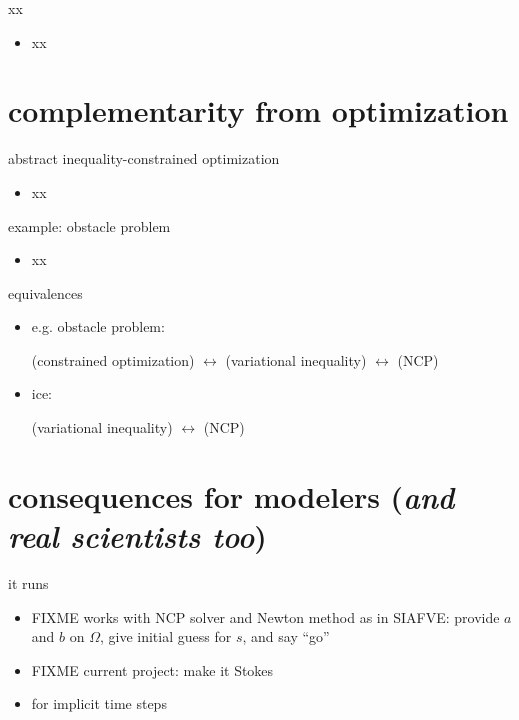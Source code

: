 \documentclass[10pt,hyperref,dvipsnames]{beamer}
\begin{document}
\begin{frame}{xx}
\begin{itemize}
\item xx
\end{itemize}
\end{frame}


\section{complementarity from optimization}

\begin{frame}{abstract inequality-constrained optimization}
\begin{itemize}
\item xx
\end{itemize}
\end{frame}

\begin{frame}{example: obstacle problem}
\begin{itemize}
\item xx
\end{itemize}
\end{frame}

\begin{frame}{equivalences}
\begin{itemize}
\item e.g. obstacle problem:

(constrained optimization) $\leftrightarrow$ (variational inequality) $\leftrightarrow$ (NCP)
\item ice:

\phantom{(constrained optimization) $\leftrightarrow$} (variational inequality) $\leftrightarrow$ (NCP)
\end{itemize}
\end{frame}


\section{consequences for modelers (\emph{and real scientists too})}

\begin{frame}{it runs}
\begin{itemize}
\item FIXME works with NCP solver and Newton method as in SIAFVE: provide $a$ and $b$ on $\Omega$, give initial guess for $s$, and say ``go''
\item FIXME current project: make it Stokes
\item for implicit time steps
\end{itemize}
\end{frame}
\end{document}
